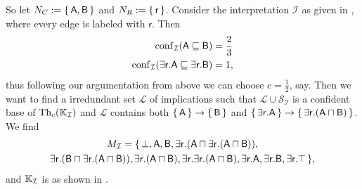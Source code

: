 \begin{Example}
  So let $N_C := {\{\, \mathsf{A}, \mathsf{B} \,\}}$ and $N_R := {\{\, \mathsf{r} \,\}}$.
  Consider the interpretation $\mathcal{I}$ as given in
  , where every edge is labeled with $\mathsf{r}$.  Then
  \begin{align*}
    \operatorname{conf}_{\mathcal{I}}(\mathsf{A} \sqsubseteq \mathsf{B}) &= \frac 2 3\\
    \operatorname{conf}_{\mathcal{I}}(\mathsf{\exists r. A} \sqsubseteq \mathsf{\exists r. B}) &= 1,
  \end{align*}
  thus following our argumentation from above we can choose $c = \frac 1 2$, say.  Then we
  want to find a irredundant set $\mathcal{L}$ of implications such that $\mathcal{L} \cup
  \mathcal{S}_{\mathcal{I}}$ is a confident base of $\operatorname{Th}_c({\mathbb{K}}_{\mathcal{I}})$ and
  $\mathcal{L}$ contains both ${\{\, \mathsf{A} \,\}} \to {\ensuremath{\{\, \mathsf{B} \,\}}}$ and ${\{\,
    \mathsf{\exists r. A} \,\}} \to {\ensuremath{\{\, \mathsf{\exists r. (A \sqcap B)} \,\}}}$.  We find
  \begin{multline*}
    M_{\mathcal{I}} = \{\, \sf \bot, A, B, \exists r.(A \sqcap \exists r.(A \sqcap B)), \\
    \sf \exists r.(B \sqcap \exists r.(A \sqcap B)), \exists r.(A \sqcap B), \exists
    r.\exists r.(A \sqcap B), \exists r.A, \exists r.B, \exists r.\top \,\},
  \end{multline*}
  and ${\mathbb{K}}_{\mathcal{I}}$ is as shown in
  .


\end{Example}
